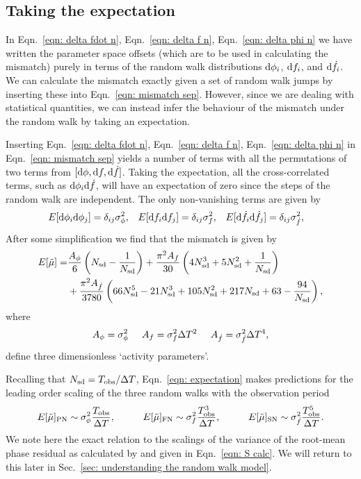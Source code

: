 \documentclass[../full_thesis/full_thesis.tex]{subfiles}
\begin{document}
\subsection{Taking the expectation}

In Eqn.~\eqref{eqn: delta fdot n}, Eqn.~\eqref{eqn: delta f n},
Eqn.~\eqref{eqn: delta phi n} we have written the parameter space offsets
(which are to be used in calculating the mismatch) purely in terms of the
random walk distributions $\mathrm{d} \phi_i$, $\mathrm{d} f_i$, and $\mathrm{d} \dot{f}_i$. We can
calculate the mismatch exactly given a set of random walk jumps by inserting
these into Eqn.~\eqref{eqn: mismatch sep}. However, since we are dealing with
statistical quantities, we can instead infer the behaviour of the mismatch
under the random walk by taking an expectation.

Inserting Eqn.~\eqref{eqn: delta fdot n}, Eqn.~\eqref{eqn: delta f n},
Eqn.~\eqref{eqn: delta phi n}  in Eqn.~\eqref{eqn: mismatch sep} yields a
number of terms with all the permutations of two terms from $[\mathrm{d} \phi, \mathrm{d} f,
\mathrm{d} \dot{f}]$. Taking the expectation, all the cross-correlated terms, such as
$\mathrm{d}\phi_{i}\mathrm{d} \dot{f}$, will have an expectation of zero since the steps of the
random walk are independent. The only non-vanishing terms are given by
\begin{align}
E[\mathrm{d}\phi_{i}\mathrm{d}\phi_{j}] &= \delta_{ij}\sigma_{\phi}^{2}, &
E[\mathrm{d}f_{i}\mathrm{d}f_{j}] &= \delta_{ij}\sigma_{f}^{2},&
E[\mathrm{d}\dot{f}_{i}\mathrm{d}\dot{f}_{j}] &= \delta_{ij}\sigma_{\dot{f}}^{2},
\end{align}
After some simplification we find that the mismatch is given by
\begin{align}
\begin{split}
E[\tilde{\mu}]   = &  \frac{A_{\phi}}{6} \left(N_{\textrm{sd}} - \frac{1}{N_{\textrm{sd}}}\right)
+ \frac{\pi^{2} A_{{f}}}{30}\left(4 N_{\textrm{sd}}^{3} + 5 N_{\textrm{sd}}^{2} + \frac{1}{N_{\textrm{sd}}}\right)\\
 & +  \frac{\pi^{2} A_{{\dot{f}}}}{3780} \left(66 N_{\textrm{sd}}^{5} - 21 N_{\textrm{sd}}^{3} + 105 N_{\textrm{sd}}^{2}
 + 217 N_{\textrm{sd}} + 63 - \frac{94}{N_{\textrm{sd}}}\right),
\end{split}
\label{eqn: expectation}
\end{align}
where
\begin{equation}
	A_{\phi} = \sigma_{\phi}^{2} \;\;\;\;\;
    A_{f} = \sigma_{f}^{2}\Delta T^{2} \;\;\;\;\;
    A_{\dot{f}} = \sigma_{\dot{f}}^{2}\Delta T^{4},
\end{equation}
define three dimensionless `activity parameters'.

Recalling that $N_{\textrm{sd}}=T_{\mathrm{obs}}/\Delta T$, Eqn.~\eqref{eqn: expectation} makes
predictions for the leading order
scaling of the three random walks with the observation period
\begin{equation}
E[\mutilde]_{\mathrm{PN}} \sim \sigP \frac{\Tobs}{\Delta T}, \hspace{10mm}
E[\mutilde]_{\mathrm{FN}} \sim \sigF \frac{\Tobs^{3}}{\Delta T}, \hspace{10mm}
E[\mutilde]_{\mathrm{SN}} \sim \sigS \frac{\Tobs^{5}}{\Delta T}.
\label{eqn: scalings}
\end{equation}
We note here the exact relation to the scalings of the variance of the
root-mean phase residual as calculated by \citet{Cordes1980} and given in
Eqn.~\eqref{eqn: S calc}. We will return to this later in Sec.~\ref{sec: understanding the random walk model}.
\end{document}
